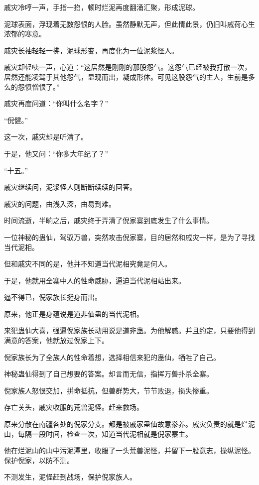 
\begin{this_body}

戚灾冷哼一声，手指一掐，顿时烂泥再度翻涌汇聚，形成泥球。

泥球表面，浮现着无数怨恨的人脸。虽然静默无声，但此情此景，仍旧叫戚荷心生浓郁的寒意。

戚灾长袖轻轻一拂，泥球形变，再度化为一位泥浆怪人。

戚灾却轻咦一声，心道：“这居然是刚刚的那股怨气。这怨气已经被我打散一次，居然还能凌驾于其他怨气，显现而出，凝成形体。可见这股怨气的主人，生前是多么的怨愤憎恨了。”

戚灾再度问道：“你叫什么名字？”

“倪健。”

这一次，戚灾却是听清了。

于是，他又问：“你多大年纪了？”

“十五。”

戚灾继续问，泥浆怪人则断断续续的回答。

戚灾的问题，由浅入深，由易到难。

时间流逝，半晌之后，戚灾终于弄清了倪家寨到底发生了什么事情。

一位神秘的蛊仙，驾驭万兽，突然攻击倪家寨，目的居然和戚灾一样，是为了寻找当代泥相。

但和戚灾不同的是，他并不知道当代泥相究竟是何人。

于是，他就用全寨中人的性命威胁，逼迫当代泥相站出来。

逼不得已，倪家族长挺身而出。

原来，他正是身蕴说是道非仙蛊的当代泥相。

来犯蛊仙大喜，强逼倪家族长动用说是道非蛊。为他解惑。并且约定，只要他得到满意的答案，他就放过倪家上下。

倪家族长为了全族人的性命着想，选择相信来犯的蛊仙，牺牲了自己。

神秘蛊仙得到了自己想要的答案。却言而无信，指挥万兽扑杀全寨。

倪家族人怒恨交加，拼命抵抗，但兽群势大，节节败退，损失惨重。

存亡关头，戚灾收服的荒兽泥怪。赶来救场。

原来分散在南疆各处的倪家分支。都是被戚家蛊仙故意豢养。戚灾负责的就是烂泥山，每隔一段时间，检查一次，知道当代泥相就是倪家寨主。

他在烂泥山的山中污泥潭里，收服了一头荒兽泥怪，并留下一股意志，操纵泥怪。保护倪家，以防不测。

不测发生，泥怪赶到战场，保护倪家族人。


\end{this_body}
